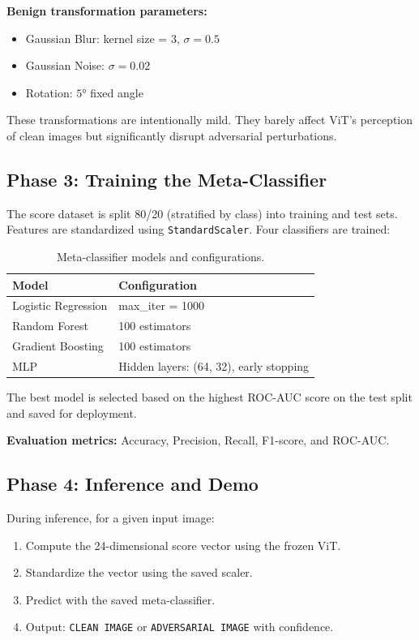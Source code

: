 \documentclass[12pt, a4paper]{article}
\begin{document}
\textbf{Benign transformation parameters:}
\begin{itemize}[nosep]
    \item Gaussian Blur: kernel size = 3, $\sigma = 0.5$
    \item Gaussian Noise: $\sigma = 0.02$
    \item Rotation: $5°$ fixed angle
\end{itemize}

These transformations are intentionally mild. They barely affect ViT's
perception of clean images but significantly disrupt adversarial
perturbations.

\subsection{Phase 3: Training the Meta-Classifier}

The score dataset is split 80/20 (stratified by class) into training and
test sets.  Features are standardized using \texttt{StandardScaler}.
Four classifiers are trained:

\begin{table}[H]
\centering
\caption{Meta-classifier models and configurations.}
\label{tab:classifiers}
\begin{tabular}{@{}ll@{}}
\toprule
\textbf{Model} & \textbf{Configuration} \\
\midrule
Logistic Regression  & max\_iter = 1000 \\
Random Forest        & 100 estimators \\
Gradient Boosting    & 100 estimators \\
MLP                  & Hidden layers: (64, 32), early stopping \\
\bottomrule
\end{tabular}
\end{table}

The best model is selected based on the highest ROC-AUC score on the test
split and saved for deployment.

\textbf{Evaluation metrics:} Accuracy, Precision, Recall, F1-score, and
ROC-AUC.

\subsection{Phase 4: Inference and Demo}

During inference, for a given input image:
\begin{enumerate}[nosep]
    \item Compute the 24-dimensional score vector using the frozen ViT.
    \item Standardize the vector using the saved scaler.
    \item Predict with the saved meta-classifier.
    \item Output: \texttt{CLEAN IMAGE} or \texttt{ADVERSARIAL IMAGE} with
          confidence.
\end{enumerate}
\end{document}
